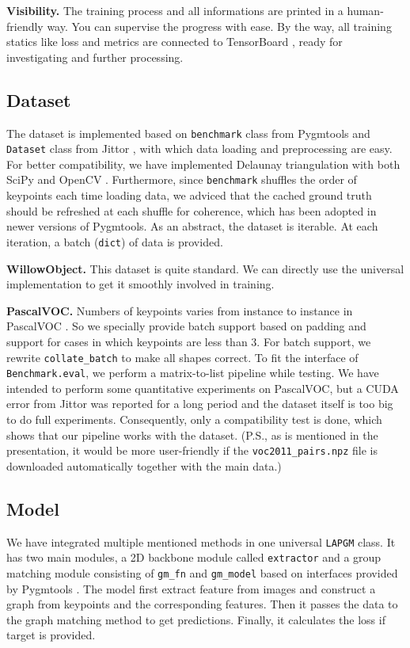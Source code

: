 \documentclass[a4paper]{article}
\begin{document}
\textbf{Visibility.}
The training process and all informations are printed in a human-friendly way. You can supervise the progress with ease. By the way, all training statics like loss and metrics are connected to TensorBoard \cite{tensorflow}, ready for investigating and further processing.

\subsection{Dataset}
The dataset is implemented based on \texttt{benchmark} class from Pygmtools \cite{pygmtools} and \texttt{Dataset} class from Jittor \cite{jittor}, with which data loading and preprocessing are easy. For better compatibility, we have implemented Delaunay triangulation with both SciPy \cite{scipy} and OpenCV \cite{opencv}. Furthermore, since \texttt{benchmark} shuffles the order of keypoints each time loading data, we adviced that the cached ground truth should be refreshed at each shuffle for coherence, which has been adopted in newer versions of Pygmtools. As an abstract, the dataset is iterable. At each iteration, a batch (\texttt{dict}) of data is provided.

\textbf{WillowObject.}
This dataset is quite standard. We can directly use the universal implementation to get it smoothly involved in training.

\textbf{PascalVOC.}
Numbers of keypoints varies from instance to instance in PascalVOC \cite{voc1,voc2}. So we specially provide batch support based on padding and support for cases in which keypoints are less than $3$. For batch support, we rewrite \texttt{collate\_batch} to make all shapes correct. To fit the interface of \texttt{Benchmark.eval}, we perform a matrix-to-list pipeline while testing. We have intended to perform some quantitative experiments on PascalVOC, but a CUDA error from Jittor \cite{jittor} was reported for a long period and the dataset itself is too big to do full experiments. Consequently, only a compatibility test is done, which shows that our pipeline works with the dataset. (P.S., as is mentioned in the presentation, it would be more user-friendly if the \texttt{voc2011\_pairs.npz} file is downloaded automatically together with the main data.) 

\subsection{Model}
We have integrated multiple mentioned methods in one universal \texttt{LAPGM} class. It has two main modules, a 2D backbone module called \texttt{extractor} and a group matching module consisting of \texttt{gm\_fn} and \texttt{gm\_model} based on interfaces provided by Pygmtools \cite{pygmtools}. The model first extract feature from images and construct a graph from keypoints and the corresponding features. Then it passes the data to the graph matching method to get predictions. Finally, it calculates the loss if target is provided.
\end{document}
